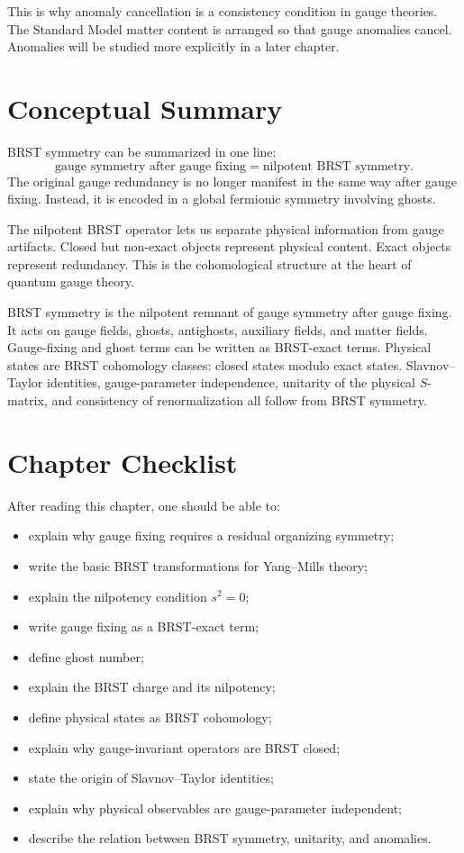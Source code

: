 This is why anomaly cancellation is a consistency condition in gauge theories.
The Standard Model matter content is arranged so that gauge anomalies cancel.
Anomalies will be studied more explicitly in a later chapter.

\section{Conceptual Summary}

BRST symmetry can be summarized in one line:
\[
    \text{gauge symmetry after gauge fixing} = \text{nilpotent BRST symmetry}.
\]
The original gauge redundancy is no longer manifest in the same way after gauge
fixing. Instead, it is encoded in a global fermionic symmetry involving ghosts.

The nilpotent BRST operator lets us separate physical information from gauge
artifacts. Closed but non-exact objects represent physical content. Exact objects
represent redundancy. This is the cohomological structure at the heart of
quantum gauge theory.

\begin{summarybox}
BRST symmetry is the nilpotent remnant of gauge symmetry after gauge fixing. It
acts on gauge fields, ghosts, antighosts, auxiliary fields, and matter fields.
Gauge-fixing and ghost terms can be written as BRST-exact terms. Physical states
are BRST cohomology classes: closed states modulo exact states. Slavnov--Taylor
identities, gauge-parameter independence, unitarity of the physical \(S\)-matrix,
and consistency of renormalization all follow from BRST symmetry.
\end{summarybox}

\section{Chapter Checklist}

After reading this chapter, one should be able to:
\begin{itemize}
    \item explain why gauge fixing requires a residual organizing symmetry;
    \item write the basic BRST transformations for Yang--Mills theory;
    \item explain the nilpotency condition \(s^2=0\);
    \item write gauge fixing as a BRST-exact term;
    \item define ghost number;
    \item explain the BRST charge and its nilpotency;
    \item define physical states as BRST cohomology;
    \item explain why gauge-invariant operators are BRST closed;
    \item state the origin of Slavnov--Taylor identities;
    \item explain why physical observables are gauge-parameter independent;
    \item describe the relation between BRST symmetry, unitarity, and anomalies.
\end{itemize}
